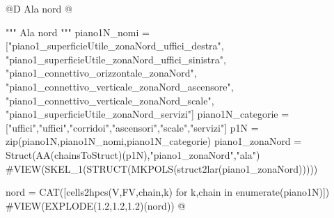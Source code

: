 \documentclass[11pt,oneside]{article}    %
\begin{document}
@D Ala nord
@{""" Ala nord """
piano1N_nomi = ["piano1_superficieUtile_zonaNord_uffici_destra", "piano1_superficieUtile_zonaNord_uffici_sinistra", "piano1_connettivo_orizzontale_zonaNord", "piano1_connettivo_verticale_zonaNord_ascensore", "piano1_connettivo_verticale_zonaNord_scale", "piano1_superficieUtile_zonaNord_servizi"]
piano1N_categorie = ["uffici","uffici","corridoi","ascensori","scale","servizi"]
p1N = zip(piano1N,piano1N_nomi,piano1N_categorie)
piano1_zonaNord = Struct(AA(chainsToStruct)(p1N),"piano1_zonaNord","ala")
#VIEW(SKEL_1(STRUCT(MKPOLS(struct2lar(piano1_zonaNord)))))
    
nord = CAT([cells2hpcs(V,FV,chain,k) for k,chain in enumerate(piano1N)])
#VIEW(EXPLODE(1.2,1.2,1.2)(nord))
@}
\end{document}
